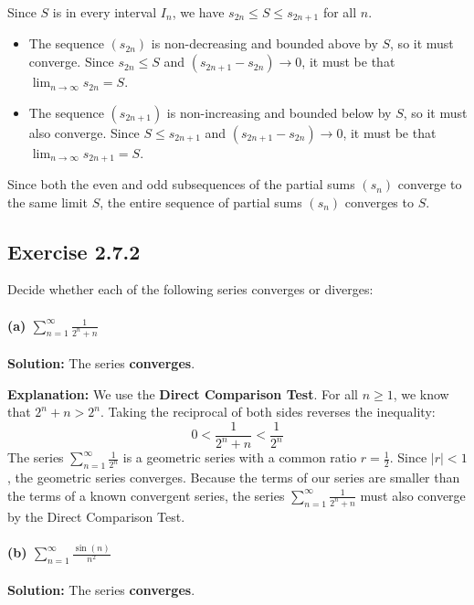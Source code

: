 \documentclass[12pt,a4paper]{article}
\theoremstyle{definition}
\theoremstyle{remark}
\begin{document}
\begin{enumerate}
    Since $S$ is in every interval $I_n$, we have $s_{2n} \le S \le s_{2n+1}$ for all $n$.
    \begin{itemize}
        \item The sequence $(s_{2n})$ is non-decreasing and bounded above by $S$, so it must converge. Since $s_{2n} \le S$ and $(s_{2n+1} - s_{2n}) \to 0$, it must be that $\lim_{n\to\infty} s_{2n} = S$.
        \item The sequence $(s_{2n+1})$ is non-increasing and bounded below by $S$, so it must also converge. Since $S \le s_{2n+1}$ and $(s_{2n+1} - s_{2n}) \to 0$, it must be that $\lim_{n\to\infty} s_{2n+1} = S$.
    \end{itemize}
    Since both the even and odd subsequences of the partial sums $(s_n)$ converge to the same limit $S$, the entire sequence of partial sums $(s_n)$ converges to $S$.
\end{enumerate}




\subsection*{Exercise 2.7.2}
Decide whether each of the following series converges or diverges:

\vspace{1em} %

\paragraph{(a) $\displaystyle\sum_{n=1}^{\infty} \frac{1}{2^n+n}$}
\textbf{Solution:} The series \textbf{converges}.

\textbf{Explanation:}
We use the \textbf{Direct Comparison Test}.
For all $n \ge 1$, we know that $2^n + n > 2^n$.
Taking the reciprocal of both sides reverses the inequality:
\[ 0 < \frac{1}{2^n+n} < \frac{1}{2^n} \]
The series $\displaystyle\sum_{n=1}^{\infty} \frac{1}{2^n}$ is a geometric series with a common ratio $r = \frac{1}{2}$. Since $|r| < 1$, the geometric series converges.
Because the terms of our series are smaller than the terms of a known convergent series, the series $\displaystyle\sum_{n=1}^{\infty} \frac{1}{2^n+n}$ must also converge by the Direct Comparison Test.

\vspace{1em}

\paragraph{(b) $\displaystyle\sum_{n=1}^{\infty} \frac{\sin(n)}{n^2}$}
\textbf{Solution:} The series \textbf{converges}.
\end{document}
